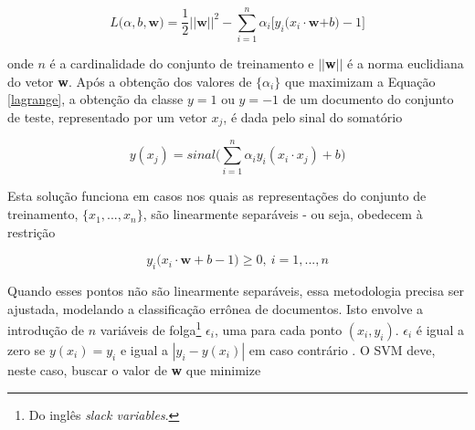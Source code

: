 




\begin{equation}
\label{lagrange}
\ensuremath{L(\alpha, b,}\textbf{w}\ensuremath{) = \frac{1}{2} ||}\textbf{w}\ensuremath{||^2 - \sum_{i = 1}^n \alpha_i\big[y_i(x_i \cdot}\textbf{w}\ensuremath{+ b) -1 \big]} %
\end{equation}

onde \ensuremath{n} é a cardinalidade do conjunto de treinamento e \ensuremath{||}\textbf{w}\ensuremath{||} é a norma euclidiana do vetor \textbf{w}. Após a obtenção dos valores de \ensuremath{\{\alpha_i\}} que maximizam a Equação \ref{lagrange}, a obtenção da classe \ensuremath{y = 1} ou \ensuremath{y = -1} de um documento do conjunto de teste, representado por um vetor \ensuremath{x_j}, é dada pelo sinal do somatório \cite{mono-puc}

\begin{equation}
\label{result:svm}
\ensuremath{y(x_j) = sinal\bigg(\sum_{i = 1}^n \alpha_iy_i(x_i \cdot x_j) + b\bigg)} %
\end{equation}

Esta solução funciona em casos nos quais as representações do conjunto de treinamento, \ensuremath{\{x_1, ..., x_n\}}, são linearmente separáveis - ou seja, obedecem à restrição \cite{mono-puc}

\begin{equation}
\label{restr2:svm}
\ensuremath{y_i(x_i \cdot} \textbf{w} + \ensuremath{b -1) \geq 0,\ i = 1,...,n}
\end{equation}

Quando esses pontos não são linearmente separáveis, essa metodologia precisa ser ajustada, modelando a classificação errônea de documentos. Isto envolve a introdução de \ensuremath{n} variáveis de folga\footnote{Do inglês \emph{slack variables}.} \ensuremath{\epsilon_i}, uma para cada ponto \ensuremath{(x_i, y_i)}. \ensuremath{\epsilon_i} é igual a zero se \ensuremath{y(x_i) = y_i} e igual a \ensuremath{|y_i - y(x_i)|} em caso contrário \cite{bishop}. O SVM deve, neste caso, buscar o valor de \textbf{w} que minimize \cite{mono-puc}

